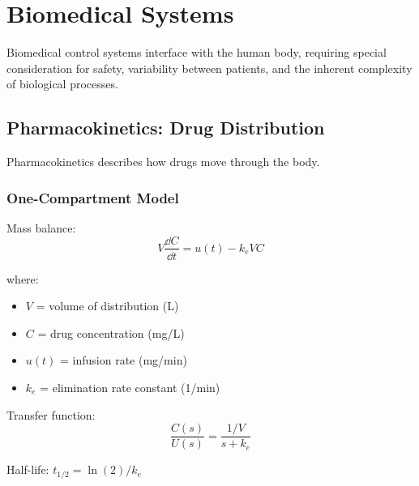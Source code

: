 
\chapter{Biomedical Systems}
\label{ch:biomedical}

Biomedical control systems interface with the human body, requiring special consideration for safety, variability between patients, and the inherent complexity of biological processes.

\section{Pharmacokinetics: Drug Distribution}
\label{sec:pharmacokinetics}

Pharmacokinetics describes how drugs move through the body.

\subsection{One-Compartment Model}



Mass balance:
\begin{equation}
V\frac{\dd C}{\dd t} = u(t) - k_e V C
\end{equation}

where:
\begin{itemize}
    \item $V$ = volume of distribution (L)
    \item $C$ = drug concentration (mg/L)
    \item $u(t)$ = infusion rate (mg/min)
    \item $k_e$ = elimination rate constant (1/min)
\end{itemize}

Transfer function:
\begin{equation}
\frac{C(s)}{U(s)} = \frac{1/V}{s + k_e}
\end{equation}

Half-life: $t_{1/2} = \ln(2)/k_e$

